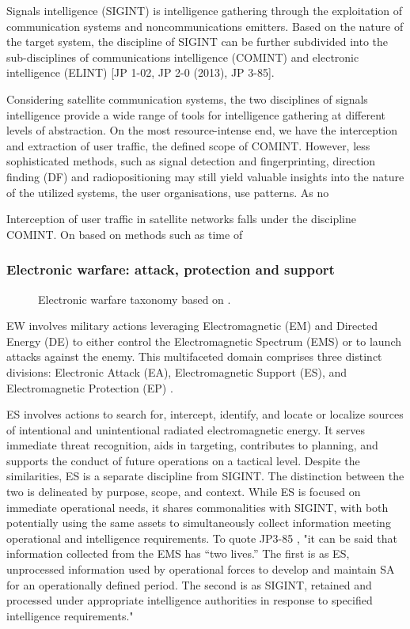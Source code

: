 \documentclass[english, 12pt, a4paper, elec, utf8, a-1b, online]{aaltothesis}
\begin{document}
Signals intelligence (SIGINT) is intelligence gathering through the exploitation of communication systems and noncommunications emitters.
Based on the nature of the target system, the discipline of SIGINT can be further subdivided into the sub-disciplines of communications intelligence (COMINT) and electronic intelligence (ELINT) \cite{national2015bulk} [JP 1-02, JP 2-0 (2013), JP 3-85].

Considering satellite communication systems, the two disciplines of signals intelligence provide a wide range of tools for intelligence gathering at different levels of abstraction.
On the most resource-intense end, we have the interception and extraction of user traffic, the defined scope of COMINT.
However, less sophisticated methods, such as signal detection and fingerprinting, direction finding (DF) and radiopositioning may still yield valuable insights into the nature of the utilized systems, the user organisations, use patterns.
As no %

Interception of user traffic in satellite networks falls under the discipline COMINT. On based on methods such as time of %

\subsubsection{Electronic warfare: attack, protection and support}

\begin{figure}[h]
  \centering
  
  \caption{Electronic warfare taxonomy based on \cite{kosola2013digitaalinen}.}
  \label{fig-electronic-warfare}
\end{figure}

EW involves military actions leveraging Electromagnetic (EM) and Directed Energy (DE) to either control the Electromagnetic Spectrum (EMS) or to launch attacks against the enemy. This multifaceted domain comprises three distinct divisions: Electronic Attack (EA), Electromagnetic Support (ES), and Electromagnetic Protection (EP) \cite{jp3-85,kosola2013digitaalinen}.

ES involves actions to search for, intercept, identify, and locate or localize sources of intentional and unintentional radiated electromagnetic energy. It serves immediate threat recognition, aids in targeting, contributes to planning, and supports the conduct of future operations on a tactical level. Despite the similarities, ES is a separate discipline from SIGINT. The distinction between the two is delineated by purpose, scope, and context. While ES is focused on immediate operational needs, it shares commonalities with SIGINT, with both potentially using the same assets to simultaneously collect information meeting operational and intelligence requirements.
To quote JP3-85 \cite{jp3-85}, "it can be said that information collected from the EMS has “two lives.”
The first is as ES, unprocessed information used by operational forces to develop and maintain SA for an operationally defined period.
The second is as SIGINT, retained and processed under appropriate intelligence authorities in response to specified intelligence requirements." %
\end{document}
